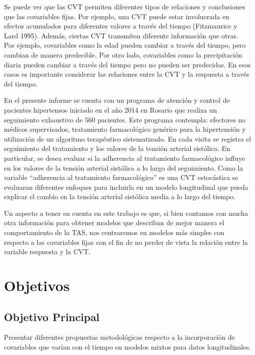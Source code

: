 \documentclass[spanish]{article}
\numberwithin{figure}{subsection}
\numberwithin{equation}{subsection}
\numberwithin{table}{subsection}
\def\npatients{560}
\def\fullcovname{adherencia al tratamiento farmacológico}
\begin{document}
Se puede ver que las CVT permiten diferentes tipos de relaciones y conclusiones
que las covariables fijas. Por ejemplo, una CVT puede estar involucrada en
efectos acumulados para diferentes valores a través del tiempo (Fitzmaurice y
Lard 1995). Además, ciertas CVT transmiten diferente información que otras. Por
ejemplo, covariables como la edad pueden cambiar a través del tiempo, pero
cambian de manera predecible. Por otro lado, covariables como la precipitación
diaria pueden cambiar a través del tiempo pero no pueden ser predecidas. En
esos casos es importante considerar las relaciones entre la CVT y la respuesta
a través del tiempo.


En el presente informe se cuenta con un programa de atención y control de
pacientes hipertensos iniciado en el año 2014 en Rosario que realiza un
seguimiento exhaustivo de \npatients{} pacientes. Este programa contempla:
efectores no médicos supervisados, tratamiento farmacológico genérico para la
hipertensión y utilización de un algoritmo terapéutico sistematizado. En cada
visita se registra el seguimiento del tratamiento y los valores de la tensión
arterial sistólica. En particular, se desea evaluar si la adherencia al
tratamiento farmacológico influye en los valores de la tensión arterial
sistólica a lo largo del seguimiento. Como la variable “\fullcovname{}” es una
CVT estocástica se evaluaran diferentes enfoques para incluirla en un modelo
longitudinal que pueda explicar el cambio en la tensión arterial sistólica
media a lo largo del tiempo.

Un aspecto a tener en cuenta en este trabajo es que, si bien contamos con mucha
otra información para obtener modelos que describan de mejor manera el
comportamiento de la TAS, nos centraremos en modelos más simples con respecto a
las covariables fijas con el fin de no perder de vista la relación entre la
variable respuesta y la CVT.

\newpage
\section{Objetivos}

\subsection{Objetivo Principal}

Presentar diferentes propuestas metodológicas respecto a la incorporación de
covariables que varían con el tiempo en modelos mixtos para datos
longitudinales.
\end{document}
